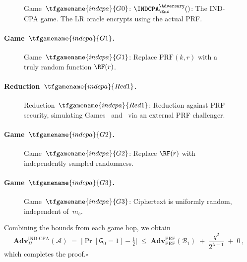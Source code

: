 \documentclass{article}
\begin{document}
\begin{figure}[ht]
\centering
{}
\caption{Game~$\tfgamename{indcpa}{G0}$: $\INDCPA_\Enc^\Adversary()$: The IND-CPA game. The LR oracle encrypts using the actual PRF.}
\label{fig:G0}
\end{figure}

\paragraph{Game~$\tfgamename{indcpa}{G1}$.}


\begin{figure}[ht]
\centering
{}
\caption{Game~$\tfgamename{indcpa}{G1}$: Replace $\mathrm{PRF}(k, r)$ with a truly random function $\RF(r)$.}
\label{fig:G1}
\end{figure}

\paragraph{Reduction~$\tfgamename{indcpa}{Red1}$.}


\begin{figure}[ht]
\centering
{}
\caption{Reduction~$\tfgamename{indcpa}{Red1}$: Reduction against PRF security, simulating Games~ and~ via an external PRF challenger.}
\label{fig:Red1}
\end{figure}

\paragraph{Game~$\tfgamename{indcpa}{G2}$.}


\begin{figure}[ht]
\centering
{}
\caption{Game~$\tfgamename{indcpa}{G2}$: Replace $\RF(r)$ with independently sampled randomness.}
\label{fig:G2}
\end{figure}

\paragraph{Game~$\tfgamename{indcpa}{G3}$.}


\begin{figure}[ht]
\centering
{}
\caption{Game~$\tfgamename{indcpa}{G3}$: Ciphertext is uniformly random, independent of~$m_b$.}
\label{fig:G3}
\end{figure}

\noindent
Combining the bounds from each game hop, we obtain
\[
  \mathbf{Adv}^{\mathrm{IND\text{-}CPA}}_\Pi(\mathcal{A})
  \;=\;
  \bigl|\Pr[\mathsf{G}_0 = 1] - \tfrac{1}{2}\bigr|
  \;\leq\;
  \mathbf{Adv}^{\mathrm{PRF}}_{\mathrm{PRF}}(\mathcal{B}_1)
  \;+\; \frac{q^2}{2^{\lambda+1}}
  \;+\; 0 \,,
\]
which completes the proof.\hfill$\square$
\end{document}
